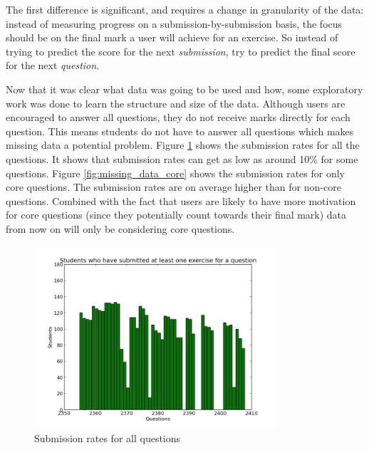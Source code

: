 The first difference is significant, and requires a change in granularity of the data: instead of measuring progress on a submission-by-submission basis, the focus should be on the final mark a user will achieve for an exercise. So instead of trying to predict the score for the next {\it submission}, try to predict the final score for the next {\it question}.

Now that it was clear what data was going to be used and how, some exploratory work was done to learn the structure and size of the data. Although users are encouraged to answer all questions, they do not receive marks directly for each question. This means students do not have to answer all questions which makes missing data a potential problem. Figure \ref{fig:missing_data} shows the submission rates for all the questions. It shows that submission rates can get as low as around 10\% for some questions. Figure \ref{fig:missing_data_core} shows the submission rates for only core questions. The submission rates are on average higher than for non-core questions. Combined with the fact that users are likely to have more motivation for core questions (since they potentially count towards their final mark) data from now on will only be considering core questions.

\begin{figure}[h!] 
\centering
\includegraphics[width=0.8\textwidth]{images/missing_data.png}
\caption{Submission rates for all questions}
\label{fig:missing_data}
\end{figure}

